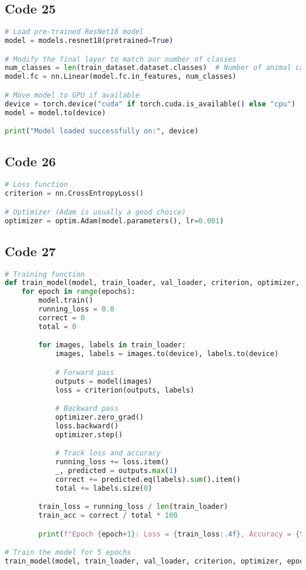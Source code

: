 \documentclass{article}
\begin{document}
\subsection*{Code 25}
\begin{lstlisting}[language=Python]
# Load pre-trained ResNet18 model
model = models.resnet18(pretrained=True)

# Modify the final layer to match our number of classes
num_classes = len(train_dataset.dataset.classes)  # Number of animal categories
model.fc = nn.Linear(model.fc.in_features, num_classes)

# Move model to GPU if available
device = torch.device("cuda" if torch.cuda.is_available() else "cpu")
model = model.to(device)

print("Model loaded successfully on:", device)

\end{lstlisting}

\subsection*{Code 26}
\begin{lstlisting}[language=Python]
# Loss function
criterion = nn.CrossEntropyLoss()

# Optimizer (Adam is usually a good choice)
optimizer = optim.Adam(model.parameters(), lr=0.001)
\end{lstlisting}

\subsection*{Code 27}
\begin{lstlisting}[language=Python]
# Training function
def train_model(model, train_loader, val_loader, criterion, optimizer, epochs=5):
    for epoch in range(epochs):
        model.train()
        running_loss = 0.0
        correct = 0
        total = 0

        for images, labels in train_loader:
            images, labels = images.to(device), labels.to(device)

            # Forward pass
            outputs = model(images)
            loss = criterion(outputs, labels)

            # Backward pass
            optimizer.zero_grad()
            loss.backward()
            optimizer.step()

            # Track loss and accuracy
            running_loss += loss.item()
            _, predicted = outputs.max(1)
            correct += predicted.eq(labels).sum().item()
            total += labels.size(0)

        train_loss = running_loss / len(train_loader)
        train_acc = correct / total * 100

        print(f"Epoch {epoch+1}: Loss = {train_loss:.4f}, Accuracy = {train_acc:.2f}%")

# Train the model for 5 epochs
train_model(model, train_loader, val_loader, criterion, optimizer, epochs=5)

\end{lstlisting}
\end{document}
